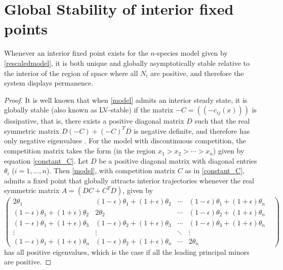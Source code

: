 \section{Global Stability of interior fixed points}
\label{appendix1c}
\begin{lem}Whenever an interior fixed point exists for the $n$-species model given by \eqref{rescaledmodel}, it is both unique and globally asymptotically stable relative to the interior of the region of space where all $N_i$ are positive, and therefore the system displays permanence.\end{lem}
\begin{proof} It is well known that when \eqref{model} admits an interior steady state, it is globally stable (also known as LV-stable) if the  matrix $-C=((-c_{ij}(x)))$ is dissipative, that is, there exists a positive diagonal matrix $D$ such that the real symmetric matrix $D(-C)+(-C)^TD$ is negative definite, and therefore has only negative eigenvalues \citep[e.g.][]{hofandsig}. For the model with discontinuous competition,  the competition matrix takes the form (in the region $x_1>x_2>\cdots > x_n$) given by equation \eqref{constant_C}. 
Let $D$ be a positive diagonal matrix with diagonal entries $\theta_i$ ($i=1,\ldots,n$).
Then \eqref{model}, with competition matrix $C$ as in \eqref{constant_C}, admits a  fixed point that globally attracts interior trajectories whenever the real symmetric matrix $A=(DC+C^TD)$, given by
\[
\label{posdef}
\begin{pmatrix}
2\theta_1&(1-\epsilon)\theta_1+(1+\epsilon)\theta_2&\cdots&(1-\epsilon)\theta_1+(1+\epsilon)\theta_n\\
(1-\epsilon)\theta_1+(1+\epsilon)\theta_2&2\theta_2& \cdots&(1-\epsilon)\theta_2+(1+\epsilon)\theta_n\\
(1-\epsilon)\theta_1+(1+\epsilon)\theta_3&(1-\epsilon)\theta_2+(1+\epsilon)\theta_3&\cdots&(1-\epsilon)\theta_3+(1+\epsilon)\theta_n\\
\vdots&\vdots&\ddots&\vdots&\\
(1-\epsilon)\theta_1+(1+\epsilon)\theta_n&(1-\epsilon)\theta_2+(1+\epsilon)\theta_n&\cdots&2\theta_n
\end{pmatrix} 
\]
has all positive eigenvalues, which is the case if all the leading principal minors are positive.


\end{proof}
